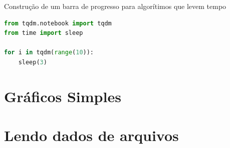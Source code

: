 Construção de um barra de progresso para algorítimos que levem tempo

\begin{lstlisting}[language=Python]
from tqdm.notebook import tqdm
from time import sleep

for i in tqdm(range(10)):
    sleep(3)
\end{lstlisting}

\section{Gráficos Simples}

\section{Lendo dados de arquivos}

